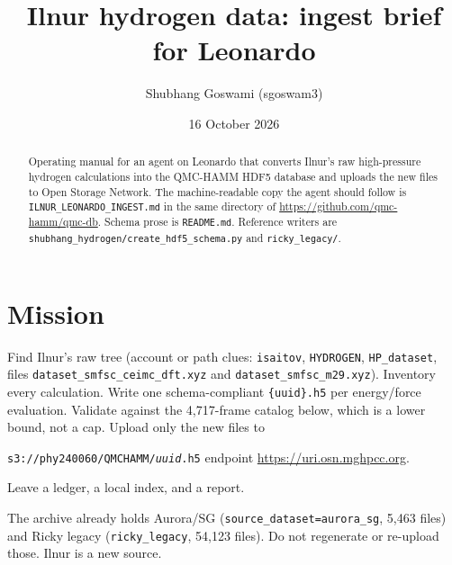 \documentclass[11pt]{article}
\title{Ilnur hydrogen data: ingest brief for Leonardo}
\author{Shubhang Goswami (sgoswam3)}
\date{16 October 2026}
\begin{document}
\maketitle

\begin{abstract}
Operating manual for an agent on Leonardo that converts Ilnur's raw
high-pressure hydrogen calculations into the QMC-HAMM HDF5 database and
uploads the new files to Open Storage Network. The machine-readable copy
the agent should follow is \texttt{ILNUR\_LEONARDO\_INGEST.md} in the same
directory of \url{https://github.com/qmc-hamm/qmc-db}. Schema prose is
\texttt{README.md}. Reference writers are
\texttt{shubhang\_hydrogen/create\_hdf5\_schema.py} and
\texttt{ricky\_legacy/}.
\end{abstract}

\section{Mission}
Find Ilnur's raw tree (account or path clues: \texttt{isaitov},
\texttt{HYDROGEN}, \texttt{HP\_dataset}, files
\texttt{dataset\_smfsc\_ceimc\_dft.xyz} and \texttt{dataset\_smfsc\_m29.xyz}).
Inventory every calculation. Write one schema-compliant \texttt{\{uuid\}.h5}
per energy/force evaluation. Validate against the 4{,}717-frame catalog below,
which is a lower bound, not a cap. Upload only the new files to
\begin{center}
\texttt{s3://phy240060/QMCHAMM/\textit{uuid}.h5}
\qquad endpoint \url{https://uri.osn.mghpcc.org}.
\end{center}
Leave a ledger, a local index, and a report.

The archive already holds Aurora/SG (\texttt{source\_dataset=aurora\_sg},
5{,}463 files) and Ricky legacy (\texttt{ricky\_legacy}, 54{,}123 files).
Do not regenerate or re-upload those. Ilnur is a new source.
\end{document}
